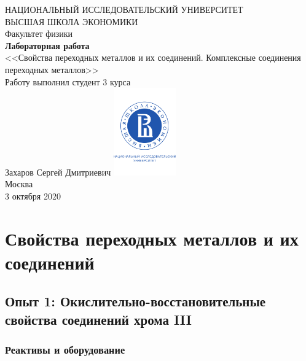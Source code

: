 \documentclass[a4paper, 12pt]{article}
\begin{document}
	\begin{titlepage}
		\begin{center}
			$$$$
			$$$$
			$$$$
			$$$$
			{\Large{НАЦИОНАЛЬНЫЙ ИССЛЕДОВАТЕЛЬСКИЙ УНИВЕРСИТЕТ}}\\
			\vspace{0.1cm}
			{\Large{ВЫСШАЯ ШКОЛА ЭКОНОМИКИ}}\\
			\vspace{0.25cm}
			{\large{Факультет физики}}\\
			\vspace{5.5cm}
			{\Huge\textbf{{Лабораторная работа}}}\\%
			\vspace{1cm}
			{\LARGE{<<Свойства переходных металлов и их соединений. Комплексные соединения переходных металлов>>}}\\%
			\vspace{2cm}
			{Работу выполнил студент 3 курса}\\
			{Захаров Сергей Дмитриевич}
			\vfill
			\includegraphics[width = 0.2\textwidth]{HSElogo}\\
			\vfill
			Москва\\
			3 октября 2020
		\end{center}
	\end{titlepage}

\tableofcontents

\newpage


\section{Свойства переходных металлов и их соединений}

\subsection{Опыт 1: Окислительно-восстановительные свойства соединений хрома III}

\subsubsection{Реактивы и оборудование}
\end{document}

